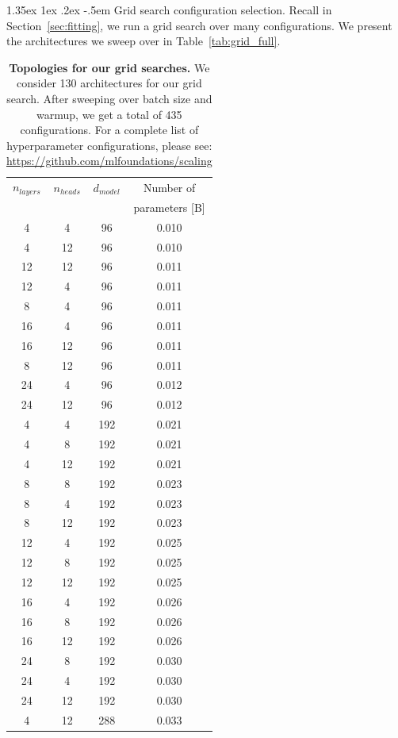 \documentclass[dvipsnames,11pt]{article}
\makeatletter
\renewcommand\paragraph{\@startsection{paragraph}{4}{\z@}                                     {1.35ex \@plus1ex \@minus.2ex}                                {-.5em}
{\normalfont\normalsize\bfseries}}
\makeatother
\begin{document}
\begin{appendix}
\paragraph{Grid search configuration selection.}
Recall in Section~\ref{sec:fitting}, we run a grid search over many configurations.
We present the architectures we sweep over in Table~\ref{tab:grid_full}.
\begin{table}[tp]
\tiny
\centering
\caption{\textbf{Topologies for our grid searches.} We consider 130 architectures for our grid search. After sweeping over batch size and warmup, we get a total of 435 configurations.
For a complete list of hyperparameter configurations, please see: \url{https://github.com/mlfoundations/scaling}
}
\begin{tabular}{cccc}
\toprule
$n_{layers}$ & $n_{heads}$ & $d_{model}$ & Number of \\
 & & & parameters [B]\\
\midrule
4 & 4 & 96 & 0.010\\
4 & 12 & 96 & 0.010\\
12 & 12 & 96 & 0.011\\
12 & 4 & 96 & 0.011\\
8 & 4 & 96 & 0.011\\
16 & 4 & 96 & 0.011\\
16 & 12 & 96 & 0.011\\
8 & 12 & 96 & 0.011\\
24 & 4 & 96 & 0.012\\
24 & 12 & 96 & 0.012\\
4 & 4 & 192 & 0.021\\
4 & 8 & 192 & 0.021\\
4 & 12 & 192 & 0.021\\
8 & 8 & 192 & 0.023\\
8 & 4 & 192 & 0.023\\
8 & 12 & 192 & 0.023\\
12 & 4 & 192 & 0.025\\
12 & 8 & 192 & 0.025\\
12 & 12 & 192 & 0.025\\
16 & 4 & 192 & 0.026\\
16 & 8 & 192 & 0.026\\
16 & 12 & 192 & 0.026\\
24 & 8 & 192 & 0.030\\
24 & 4 & 192 & 0.030\\
24 & 12 & 192 & 0.030\\
4 & 12 & 288 & 0.033\\

\end{tabular}
\end{table}
\end{appendix}
\end{document}
